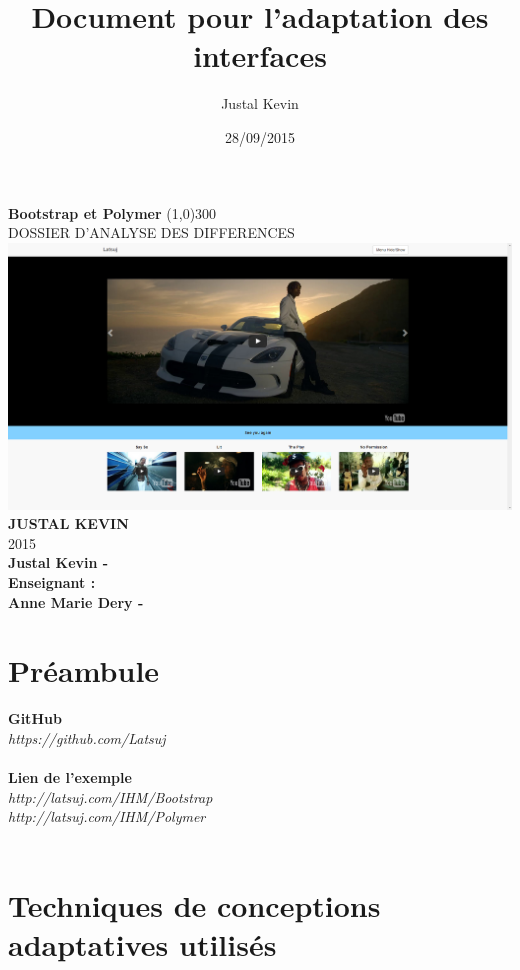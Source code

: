 \documentclass{article}
\title{Document pour l'adaptation des interfaces}
\author{Justal Kevin}
\date{28/09/2015}
\begin{document}
\begin{center}
\textbf{\Huge{Bootstrap et Polymer}}
\line(1,0){300}\\
DOSSIER D'ANALYSE DES DIFFERENCES\\
\vspace{3cm}
\includegraphics[width=1.0\textwidth]{p1}\\
\vspace{3cm}
\textbf{\Large{JUSTAL KEVIN}}\\
2015\\
\vspace{2cm}
\textbf{Justal Kevin -  \color{black}{- SI5 - IHM}}\\
\vspace{4cm}
\textbf{Enseignant :}\\
\textbf{Anne Marie Dery - }
\end{center}

\newpage
\section{Pr\'eambule}
\textbf{GitHub}\\
\textit{https://github.com/Latsuj}\\
\vspace{0.5cm}\\
\textbf{Lien de l'exemple}\\
\textit{http://latsuj.com/IHM/Bootstrap}\\
\textit{http://latsuj.com/IHM/Polymer}\\
\vspace{0.5cm}\\
\newpage
\tableofcontents

\newpage

\section{Techniques de conceptions adaptatives utilis\'es}
\end{document}
